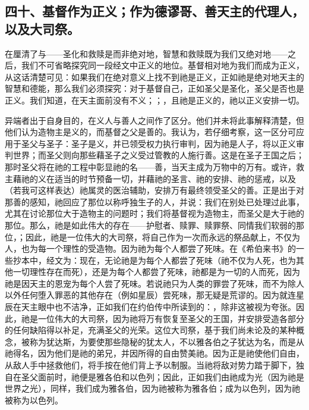 
\subsection{四十、基督作为正义；作为德谬哥、善天主的代理人，以及大司祭。}

在厘清了与——圣化和救赎是而非绝对地，智慧和救赎既为我们又绝对地——之后，我们不可省略探究同一段经文中正义的地位。基督相对地为我们而成为正义，从这话清楚可见：如果我们在绝对意义上找不到祂是正义，正如祂是绝对地天主的智慧和德能，那么我们必须探究：对于基督自己，正如圣父是圣化，圣父是否也是正义。我们知道，在天主面前没有不义；；，且祂是正义的，祂以正义安排一切。\par

异端者出于自身目的，在义人与善人之间作了区分。他们并未将此事解释清楚，但他们认为造物主是义的，而基督之父是善的。我认为，若仔细考察，这一区分可应用于圣父与圣子：圣子是义，并已领受权力执行审判，因为祂是人子，将以正义审判世界；而圣父则向那些藉圣子之义受过管教的人施行善。这是在圣子王国之后；那时圣父将在祂的工程中彰显祂的名——善，当天主成为万物中的万有。或许，救主藉祂的义在适当的时节预备一切，并藉祂的圣言、祂的安排、祂的惩戒，以及（若我可这样表达）祂属灵的医治辅助，安排万有最终领受圣父的善。正是出于对那善的感知，祂回应了那位以称呼独生子的人，并说：我们在别处已处理过此事，尤其在讨论那位大于造物主的问题时；我们将基督视为造物主，而圣父是大于祂的那位。那么，祂是如此伟大的存在——护慰者、赎罪、赎罪祭、同情我们软弱的那位，；因此，祂是一位伟大的大司祭，将自己作为一次而永远的祭品献上，不仅为人，也为每一个理性的受造物。因为祂为每个人都尝了死味。在《希伯来书》的一些抄本中，经文为：现在，无论祂是为每个人都尝了死味（祂不仅为人死，也为其他一切理性存在而死），还是为每个人都尝了死味，祂都是为一切的人而死，因为祂是因天主的恩宠为每个人尝了死味。若说祂只为人类的罪尝了死味，而不为除人以外任何堕入罪恶的其他存在（例如星辰）尝死味，那无疑是荒谬的。因为就连星辰在天主眼中也不洁净，正如我们在约伯传中所读到的：，除非这被视为夸张。因此，祂是一位伟大的大司祭，因为祂将万有恢复至圣父的王国，并安排受造各部分的任何缺陷得以补足，充满圣父的光荣。这位大司祭，基于我们尚未论及的某种概念，被称为犹达斯，为要使那些隐秘的犹太人，不以雅各伯之子犹达为名，而是从祂得名，因为他们是祂的弟兄，并因所得的自由赞美祂。因为正是祂使他们自由，从敌人手中拯救他们，将手按在他们背上予以制服。当祂将敌对势力踏于脚下，独自在圣父面前时，祂便是雅各伯和以色列；因此，正如我们由祂成为光（因为祂是世界之光），同样，我们成为雅各伯，因为祂被称为雅各伯；成为以色列，因为祂被称为以色列。\par

